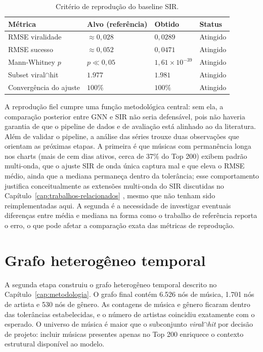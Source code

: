 \begin{table}[htbp]
\centering
\caption{Critério de reprodução do baseline SIR.}
\label{tab:phase0-r4}
\begin{tabular}{p{4.5cm}p{2.5cm}p{2.5cm}p{2.0cm}}
\hline
\textbf{Métrica} & \textbf{Alvo (referência)} & \textbf{Obtido} & \textbf{Status} \\
\hline
RMSE viralidade & $\approx 0{,}028$ & $0{,}0289$ & Atingido \\
RMSE sucesso & $\approx 0{,}052$ & $0{,}0471$ & Atingido \\
Mann-Whitney $p$ & $p \ll 0{,}05$ & $1{,}61 \times 10^{-39}$ & Atingido \\
Subset viral$\cap$hit & $1.977$ & $1.981$ & Atingido \\
Convergência do ajuste & $100\%$ & $100\%$ & Atingido \\
\hline
\end{tabular}
\end{table}


A reprodução fiel cumpre uma função metodológica central: sem ela, a comparação posterior entre GNN e SIR não seria defensável, pois não haveria garantia de que o pipeline de dados e de avaliação está alinhado ao da literatura. Além de validar o pipeline, a análise das séries trouxe duas observações que orientam as próximas etapas. A primeira é que músicas com permanência longa nos charts (mais de cem dias ativos, cerca de 37\% do Top 200) exibem padrão multi-onda, que o ajuste SIR de onda única captura mal e que eleva o RMSE médio, ainda que a mediana permaneça dentro da tolerância; esse comportamento justifica conceitualmente as extensões multi-onda do SIR discutidas no Capítulo~\ref{cap:trabalhos-relacionados} \citep{oliveira2025asonam}, mesmo que não tenham sido reimplementadas aqui. A segunda é a necessidade de investigar eventuais diferenças entre média e mediana na forma como o trabalho de referência reporta o erro, o que pode afetar a comparação exata das métricas de reprodução.


\section{Grafo heterogêneo temporal}

A segunda etapa construiu o grafo heterogêneo temporal descrito no Capítulo~\ref{cap:metodologia}. O grafo final contém 6.526 nós de música, 1.701 nós de artista e 530 nós de gênero. As contagens de música e gênero ficaram dentro das tolerâncias estabelecidas, e o número de artistas coincidiu exatamente com o esperado. O universo de música é maior que o subconjunto \emph{viral$\cap$hit} por decisão de projeto: incluir músicas presentes apenas no Top 200 enriquece o contexto estrutural disponível ao modelo.

